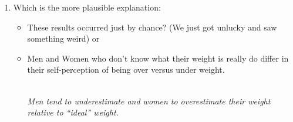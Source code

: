 \begin{enumerate}
\begin{enumerate}
   \item  Which is the more plausible explanation:
     \begin{itemize}
     \item 
     These results   occurred just by chance? (We just got unlucky and
     saw something weird) or
   \item 
     Men and Women who don't know what their weight is really do
     differ in their self-perception of being over versus under weight.
\begin{students}
       \vspace{2cm}
\end{students}
\begin{key}
 \\  {\it Men tend to underestimate and women to overestimate their
     weight relative to ``ideal'' weight.}  
\end{key}
     \end{itemize}


\end{enumerate}
\end{enumerate}
